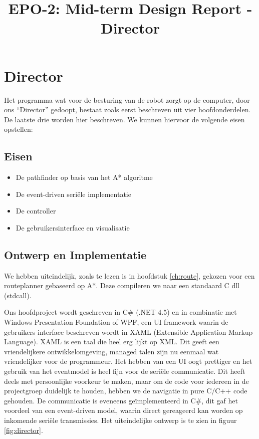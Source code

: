 \documentclass{report}
\title{EPO-2: Mid-term Design Report - Director}
\author{}
\begin{document}
\chapter{Director}
\label{ch:director}
Het programma wat voor de besturing van de robot zorgt op de computer, door ons ``Director'' gedoopt, bestaat zoals eerst beschreven uit vier hoofdonderdelen. De laatste drie worden hier beschreven. We kunnen hiervoor de volgende eisen opstellen:

\section{Eisen}
\label{sec:dirEisen}
\begin{itemize}
\item De pathfinder op basis van het A* algoritme
\item De event-driven seriële implementatie
\item De controller
\item De gebruikersinterface en visualisatie
\end{itemize}

\section{Ontwerp en Implementatie}
\label{sec:dirImplementatie}
We hebben uiteindelijk, zoals te lezen is in hoofdstuk \ref{ch:route}, gekozen voor een routeplanner gebaseerd op A*. Deze compileren we naar een standaard C dll (stdcall).

Ons hoofdproject wordt geschreven in C\# (.NET 4.5) en in combinatie met Windows Presentation Foundation of WPF, een UI framework waarin de gebruikers interface beschreven wordt in XAML (Extensible Application Markup Language).
XAML is een taal die heel erg lijkt op XML.
Dit geeft een vriendelijkere ontwikkelomgeving, managed talen zijn nu eenmaal wat vriendelijker voor de programmeur.
Het hebben van een UI oogt prettiger en het gebruik van het eventmodel is heel fijn voor de seriële communicatie.
Dit heeft deels met persoonlijke voorkeur te maken, maar om de code voor iedereen in de projectgroep duidelijk te houden, hebben we de navigatie in pure C/C++ code gehouden.
De communicatie is eveneens geïmplementeerd in C\#, dit gaf het voordeel van een event-driven model, waarin direct gereageerd kan worden op inkomende seriële transmissies. Het uiteindelijke ontwerp is te zien in figuur \ref{fig:director}.
\end{document}
